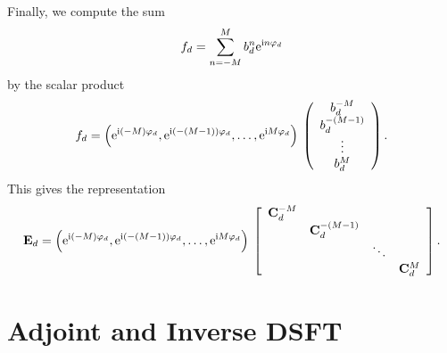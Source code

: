 Finally, we compute the sum
\[
  f_{d} = \sum_{n=-M}^M b^{n}_{d} \mbox{\rm{e}}^{\mbox{\scriptsize\rm{i}} n \varphi_{d}}
\]
by the scalar product
\[
  f_{d} 
  = 
  \left(\mbox{\rm{e}}^{\mbox{\scriptsize\rm{i}} (-M) \varphi_{d}},\mbox{\rm{e}}^{\mbox{\scriptsize\rm{i}} (-(M-1)) \varphi_{d}},\ldots,\mbox{\rm{e}}^{\mbox{\scriptsize\rm{i}} M \varphi_{d}}\right)
  \:   
  \left(\begin{array}{c}
    b^{-M}_{d}\\
    b^{-(M-1)}_{d}\\
    \vdots\\
    b^{M}_{d}
  \end{array}\right).
\]
This gives the representation
\[
  \mathbf{E}_{d} = \left(\mbox{\rm{e}}^{\mbox{\scriptsize\rm{i}} (-M) \varphi_{d}},\mbox{\rm{e}}^{\mbox{\scriptsize\rm{i}} (-(M-1)) \varphi_{d}},\ldots,\mbox{\rm{e}}^{\mbox{\scriptsize\rm{i}} M \varphi_{d}}\right) \:  
  \left[\begin{array}{cccc}
    \mathbf{C}^{-M}_{d} &                    &        &               \\
                   & \mathbf{C}^{-(M-1)}_{d} &        &               \\
                   &                    & \ddots &               \\
                   &                    &        & \mathbf{C}^{M}_{d} 
  \end{array}\right].
\]

\section{Adjoint and Inverse DSFT}

